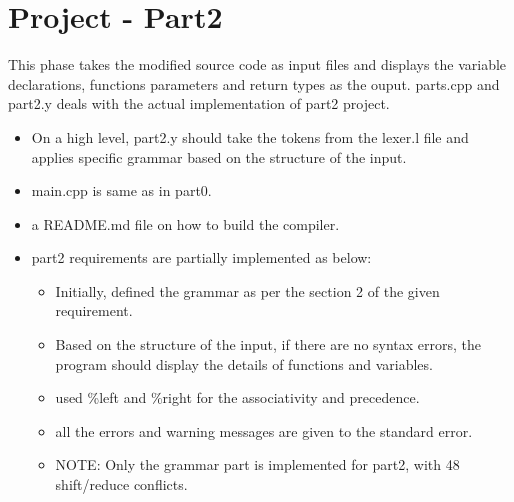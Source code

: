 \documentclass{article}
\begin{document}
\section{Project - Part2}
This phase takes the modified source code as input files and displays the variable declarations, functions parameters and return types as the ouput.
\newline parts.cpp and part2.y deals with the actual implementation of part2 project.
\begin{itemize}
  \item On a high level, part2.y should take the tokens from the lexer.l file and applies specific grammar based on the structure of the input.
  \item main.cpp is same as in part0.
  \item a README.md file on how to build the compiler.
  \item part2 requirements are partially implemented as below:
  \begin{itemize}
    \item Initially, defined the grammar as per the section 2 of the given requirement.
    \item Based on the structure of the input, if there are no syntax errors, the program should display the details of functions and variables.
    \item used \%left and \%right for the associativity and precedence. 
    \item all the errors and warning messages are given to the standard error.
    \item NOTE: Only the grammar part is implemented for part2, with 48 shift/reduce conflicts.
  \end{itemize}
\end{itemize}
\end{document}
